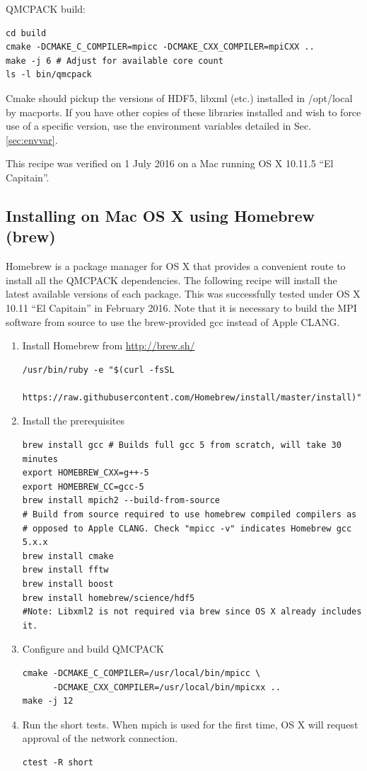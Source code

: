 QMCPACK build:
\begin{verbatim}
cd build
cmake -DCMAKE_C_COMPILER=mpicc -DCMAKE_CXX_COMPILER=mpiCXX ..
make -j 6 # Adjust for available core count
ls -l bin/qmcpack
\end{verbatim}

Cmake should pickup the versions of HDF5, libxml (etc.) installed in
/opt/local by macports. If you have other copies of these libraries
installed and wish to force use of a specific version, use the
environment variables detailed in Sec. \ref{sec:envvar}.

This recipe was verified on 1 July 2016 on a Mac running OS X 10.11.5
``El Capitain''.

\subsection{Installing on Mac OS X using Homebrew (brew)}
Homebrew is a package manager for OS X that provides a convenient
route to install all the QMCPACK dependencies. The
following recipe will install the latest available versions of each
package. This was successfully tested under OS X 10.11 ``El
Capitain'' in February 2016. Note that it is necessary to build the MPI software from
source to use the brew-provided gcc instead of Apple CLANG.

\begin{enumerate}
\item Install Homebrew from \url{http://brew.sh/}
\begin{verbatim}
/usr/bin/ruby -e "$(curl -fsSL
    https://raw.githubusercontent.com/Homebrew/install/master/install)"
\end{verbatim}

\item Install the prerequisites
\begin{verbatim}
brew install gcc # Builds full gcc 5 from scratch, will take 30 minutes
export HOMEBREW_CXX=g++-5
export HOMEBREW_CC=gcc-5
brew install mpich2 --build-from-source
# Build from source required to use homebrew compiled compilers as
# opposed to Apple CLANG. Check "mpicc -v" indicates Homebrew gcc 5.x.x
brew install cmake
brew install fftw
brew install boost
brew install homebrew/science/hdf5
#Note: Libxml2 is not required via brew since OS X already includes it.
\end{verbatim}
\item Configure and build QMCPACK
\begin{verbatim}
cmake -DCMAKE_C_COMPILER=/usr/local/bin/mpicc \
      -DCMAKE_CXX_COMPILER=/usr/local/bin/mpicxx ..
make -j 12
\end{verbatim}
\item Run the short tests. When mpich is used for the first time, OS
  X will request approval of the network connection.
\begin{verbatim}
ctest -R short
\end{verbatim}
\end{enumerate}

